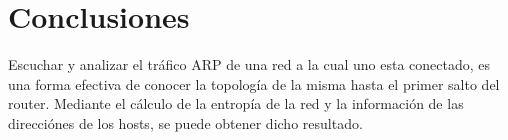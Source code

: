 \section{Conclusiones}

Escuchar y analizar el tráfico ARP de una red a la cual uno esta conectado, 
es una forma efectiva de conocer la topología de la misma hasta el primer salto del router.
Mediante el cálculo de la entropía de la red y la información de las direcciónes de los hosts, se puede obtener dicho resultado.
